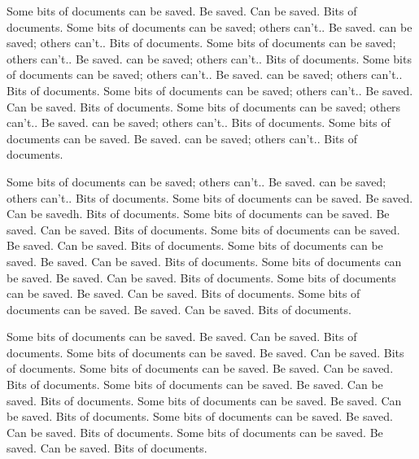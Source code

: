 \documentclass[11pt]{book}
\begin{document}
Some bits of documents can be saved.  Be saved.
Can be saved.  Bits of documents.
Some bits of documents can be saved; others can't..  Be saved.
can be saved; others can't..  Bits of documents.
Some bits of documents can be saved; others can't..  Be saved.
can be saved; others can't..  Bits of documents.
Some bits of documents can be saved; others can't..  Be saved.
can be saved; others can't..  Bits of documents.
Some bits of documents can be saved; others can't..  Be saved.
Can be saved.  Bits of documents.
Some bits of documents can be saved; others can't..  Be saved.
can be saved; others can't..  Bits of documents.
Some bits of documents can be saved.  Be saved.
can be saved; others can't..  Bits of documents.

Some bits of documents can be saved; others can't..  Be saved.
can be saved; others can't..  Bits of documents.
Some bits of documents can be saved.  Be saved.
Can be savedh.  Bits of documents.
Some bits of documents can be saved.  Be saved.
Can be saved.  Bits of documents.
Some bits of documents can be saved.  Be saved.
Can be saved.  Bits of documents.
Some bits of documents can be saved.  Be saved.
Can be saved.  Bits of documents.
Some bits of documents can be saved.  Be saved.
Can be saved.  Bits of documents.
Some bits of documents can be saved.  Be saved.
Can be saved.  Bits of documents.
Some bits of documents can be saved.  Be saved.
Can be saved.  Bits of documents.

Some bits of documents can be saved.  Be saved.
Can be saved.  Bits of documents.
Some bits of documents can be saved.  Be saved.
Can be saved.  Bits of documents.
Some bits of documents can be saved.  Be saved.
Can be saved.  Bits of documents.
Some bits of documents can be saved.  Be saved.
Can be saved.  Bits of documents.
Some bits of documents can be saved.  Be saved.
Can be saved.  Bits of documents.
Some bits of documents can be saved.  Be saved.
Can be saved.  Bits of documents.
Some bits of documents can be saved.  Be saved.
Can be saved.  Bits of documents.
\end{document}
